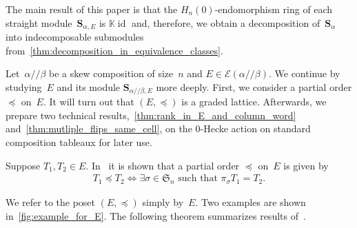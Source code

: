 \documentclass[10pt]{amsart}
\theoremstyle{plain}
\theoremstyle{plain}
\theoremstyle{plain}
\theoremstyle{plain}
\theoremstyle{plain}
\theoremstyle{definition}
\theoremstyle{definition}
\newcommand{\bs}[1]{\boldsymbol{#1} }
\newcommand{\mc}[1]{\mathcal{#1} }
\newcommand{\K}{\mathbb K}
\DeclareMathOperator{\id}{id}
\newcommand{\fS}{\mathfrak{S}}
\newcommand{\He}{H_n(0)}
\newcommand{\ab}{{\alpha / \! \! / \beta}}
\newcommand{\pleq}{\preceq}
\newcommand{\sa}{\bs S_{\alpha}}
\newcommand{\se}{\bs S_{\alpha,E}}
\newcommand{\sse}{\bs S_{\ab,E}}
\begin{document}
The main result of this paper is that the $\He$-endomorphism ring of each straight module~$\se$ is $\K \id$ and, therefore, we obtain a decomposition of~$\sa$ into indecomposable submodules from~\cref{thm:decomposition_in_equivalence_classes}.


Let~$\ab$ be a skew composition of size~$n$ and $E\in \mc E(\ab)$.
 We continue by studying~$E$ and its module $\sse$ more deeply.
First, we consider a partial order $\pleq$ on~$E$.
It will turn out that $(E,\pleq)$ is a graded lattice.
Afterwards, we prepare two technical results,~\cref{thm:rank_in_E_and_column_word} and~\cref{thm:mutliple_flips_same_cell}, on the 0-Hecke action on standard composition tableaux for later use. 

Suppose $T_1,T_2\in E$. In~\cite[Section~4]{Tewari2015} it is shown that a partial order $\pleq$ on~$E$ is given by
\begin{align*}
	T_1 \pleq T_2 \iff \exists \sigma \in \fS_n \text{ such that } \pi_\sigma T_1 = T_2.
\end{align*}

 We refer to the poset $(E,\pleq)$ simply by~$E$. Two examples are shown in~\cref{fig:example_for_E}. The following theorem summarizes results of~\cite[Section~6]{Tewari2015}.
\end{document}
